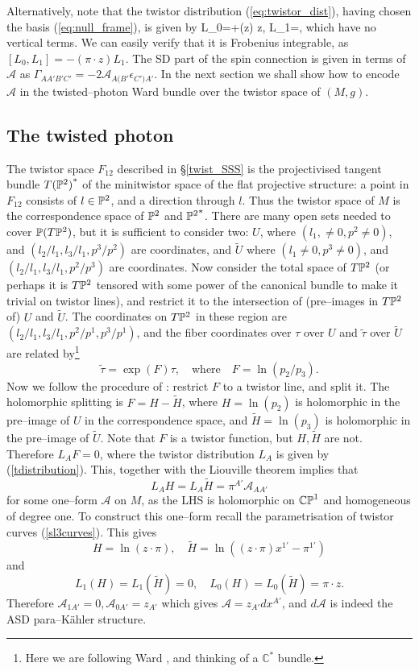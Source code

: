 Alternatively, note that the twistor distribution (\ref{eq:twistor_dist}), having chosen the basis (\ref{eq:null_frame}), is given by
\be
\label{tdistribution}
L_{0}=\pi\cdot{}+(z\cdot\pi) z\cdot{}, \quad
L_{1}=\pi\cdot{},
\ee
which have no vertical terms. We can easily verify that it is Frobenius integrable, as $[L_{0}, L_{1}]=-(\pi\cdot z)L_{1}$. The SD part of the
spin connection is given in terms of ${\mathcal A}$ as
$\Gamma_{AA'B'C'}=-2{\mathcal A}_{A(B'}\epsilon_{C')A'}$.
\koniec
In the next section we shall show how to encode
${\mathcal A}$ in the twisted--photon Ward bundle over the twistor space
of $(M, g)$.
\subsection{The twisted photon}
The twistor space $F_{12}$ described in \S\ref{twist_SSS} is the projectivised tangent bundle ${T(\mathbb{P}^2)}^*$ of the minitwistor space of the flat projective structure: a point in $F_{12}$ consists of $l\in\mathbb{P}^2$, and a direction through $l$. Thus the twistor space of $M$ is the correspondence space
of $\mathbb{P}^2$ and ${\mathbb{P}^2}^*$. 
There are many open sets needed to cover
$\mathbb{P}(T\mathbb{P}^2)$, but it is sufficient to consider two:
$U$, where $(l_1, \neq 0, p^2\neq 0)$, and $(l_2/l_1, l_3/l_1, p^3/p^2)$ are coordinates, and $\widetilde{U}$ where
$(l_1\neq 0, p^3\neq 0)$, and  $(l_2/l_1, l_3/l_1, p^2/p^3)$
are coordinates. Now consider the total
space of $T\mathbb{P}^2$ (or perhaps it is $T\mathbb{P}^2$ tensored
with some power of the canonical bundle to make it trivial on twistor
lines), and restrict it to the intersection of (pre--images in
$T\mathbb{P}^2$
of) $U$ and $\widetilde{U}$. The coordinates on $T\mathbb{P}^2$ in these
region are $(l_2/l_1, l_3/l_1, p^2/p^1, p^3/p^1)$, and the fiber
coordinates over $\tau$ over $U$ and $\tilde{\tau}$ over 
$\widetilde{U}$ are related by\footnote{Here we are following Ward \cite{wardtf},
and thinking of a $\mathbb{C}^*$ bundle.}
\[
\tilde \tau=\exp(F)\tau, \quad\mbox{where}\quad  
F=\ln{(p_2/p_3)}.
\]
Now we follow the procedure of \cite{wardtf}: restrict $F$ to a twistor line,
and split it.
The holomorphic splitting is $F=H-\widetilde{H}$, where
$H=\ln{(p_2)}$ is holomorphic in the pre--image of $U$ in the correspondence space, and 
$\widetilde{H}=\ln{(p_3)}$ is holomorphic in the pre--image of
$\widetilde{U}$. Note that $F$ is a twistor  function, but 
$H, \widetilde{H}$ are not. Therefore
$L_{A}F=0$, where the twistor distribution $L_{A}$
is given by (\ref{tdistribution}). This, 
together with the Liouville theorem
implies
that
\[
L_{A}H=L_{A}\widetilde{H}=\pi^{A'}\mathcal{A}_{AA'}
\]
for some one--form $\mathcal{A}$ on $M$, 
as the LHS is holomorphic on  $\mathbb{CP}^1$ and homogeneous of degree
one. To construct this one--form recall the parametrisation
of twistor curves (\ref{sl3curves}). This gives
\[
H=\ln{(z\cdot\pi)}, \quad\widetilde{H}=\ln{((z\cdot\pi)x^{1'}-\pi^{1'})}
\]
and
\[
L_{1}(H)=L_{1}(\widetilde{H})=0, \quad
L_{0}(H)=L_{0}(\widetilde{H})=\pi\cdot z.
\]
Therefore ${\mathcal A}_{1A'}=0, {\mathcal A}_{0A'}=z_{A'}$
which gives ${\mathcal A}=z_{A'}dx^{A'}$, and $d{\mathcal A}$
is indeed the ASD para--K\"ahler structure.
